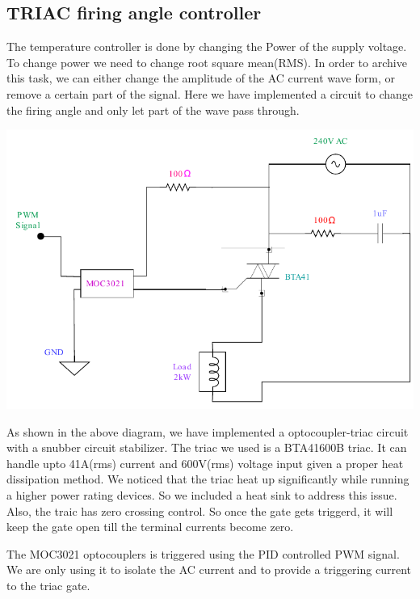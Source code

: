 \begin{multicols}{2}
\section{TRIAC firing angle controller}
The temperature controller is done by changing the Power of the supply voltage. To change power we need to change root square mean(RMS). In order to archive this task, we can either change the amplitude of the AC current wave form, or remove a certain part of the signal. Here we have implemented a circuit to change the firing angle and only let part of the wave pass through.

\begin{minipage}{0.45\textwidth}
\centering
\includegraphics[width=\textwidth]{Method/Triac Cct.pdf}
\end{minipage}



As shown in the above diagram, we have implemented a optocoupler-triac circuit with a snubber circuit stabilizer.
The triac we used is a BTA41600B triac. It can handle upto 41A(rms) current and 600V(rms) voltage input given a proper heat dissipation method. We noticed that the triac heat up significantly while running a higher power rating devices. So we included a heat sink to address this issue. Also, the traic has zero crossing control. So once the gate gets triggerd, it will keep the gate open till the terminal currents become zero.

The MOC3021 optocouplers is triggered using the PID controlled PWM signal. We are only using it to isolate the AC current and to provide a triggering current to the triac gate.


\end{multicols}
